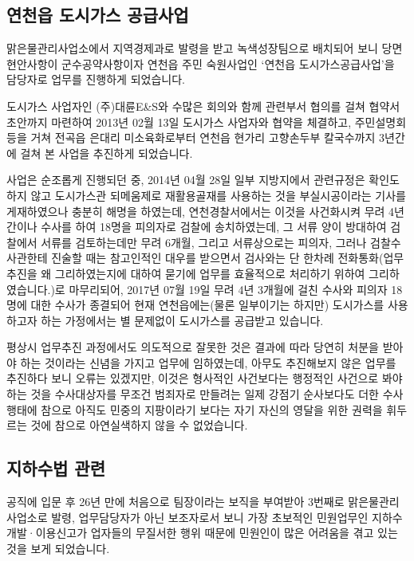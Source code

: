 \documentclass[chapter,book,openany,twoside]{oblivoir}
\begin{document}
\subsection{연천읍 도시가스 공급사업}

맑은물관리사업소에서 지역경제과로 발령을 받고 녹색성장팀으로 배치되어 보니 당면 현안사항이 군수공약사항이자 연천읍 주민 숙원사업인 `연천읍 도시가스공급사업'을 담당자로 업무를 진행하게 되었습니다.

도시가스 사업자인 (주)대륜E\&S와 수많은 회의와 함께 관련부서 협의를 걸쳐 협약서 초안까지 마련하여 2013년 02월 13일 도시가스 사업자와 협약을 체결하고, 주민설명회 등을 거쳐 전곡읍 은대리 미소육화로부터 연천읍 현가리 고향손두부 칼국수까지 3년간에 걸쳐 본 사업을 추진하게 되었습니다.

사업은 순조롭게 진행되던 중, 2014년 04월 28일 일부 지방지에서 관련규정은 확인도 하지 않고 도시가스관 되메움제로 재활용골재를 사용하는 것을 부실시공이라는 기사를 게재하였으나 충분히 해명을 하였는데, 연천경찰서에서는 이것을 사건화시켜 무려 4년 간이나 수사를 하여 18명을 피의자로 검찰에 송치하였는데, 그 서류 양이 방대하여 검찰에서 서류를 검토하는데만 무려 6개월, 그리고 서류상으로는 피의자, 그러나 검찰수사관한테 진술할 때는 참고인적인 대우를 받으면서 검사와는 단 한차례 전화통화(업무추진을 왜 그리하였는지에 대하여 묻기에 업무를 효율적으로 처리하기 위하여 그리하였습니다.)로 마무리되어, 2017년 07월 19일 무려 4년 3개월에 걸친 수사와 피의자 18명에 대한 수사가 종결되어 현재 연천읍에는(물론 일부이기는 하지만) 도시가스를 사용하고자 하는 가정에서는 별 문제없이 도시가스를 공급받고 있습니다.

평상시 업무추진 과정에서도 의도적으로 잘못한 것은 결과에 따라 당연히 처분을 받아야 하는 것이라는 신념을 가지고 업무에 임하였는데, 아무도 추진해보지 않은 업무를 추진하다 보니 오류는 있겠지만, 이것은 형사적인 사건보다는 행정적인 사건으로 봐야 하는 것을 수사대상자를 무조건 범죄자로 만들려는 일제 강점기 순사보다도 더한 수사행태에 참으로 아직도 민중의 지팡이라기 보다는 자기 자신의 영달을 위한 권력을 휘두르는 것에 참으로 아연실색하지 않을 수 없었습니다.

\subsection{지하수법 관련}

공직에 입문 후 26년 만에 처음으로 팀장이라는 보직을 부여받아 3번째로 맑은물관리사업소로 발령, 업무담당자가 아닌 보조자로서 보니 가장 초보적인 민원업무인 지하수개발·이용신고가 업자들의 무질서한 행위 때문에 민원인이 많은 어려움을 겪고 있는 것을 보게 되었습니다.
\end{document}

